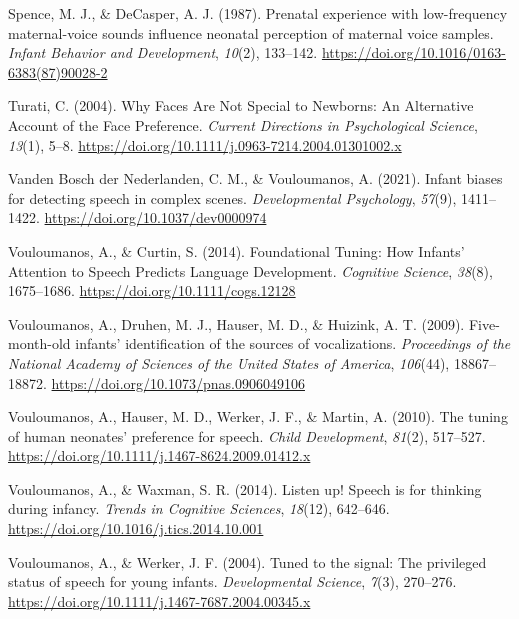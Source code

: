 \documentclass[
  man,mask,floatsintext]{apa6}
\newlength{\cslhangindent}
\newlength{\cslentryspacingunit} %
\newenvironment{CSLReferences}[2] %
 {%
  \setlength{\parindent}{0pt}
  \ifodd #1
  \let\oldpar\par
  \def\par{\hangindent=\cslhangindent\oldpar}
  \fi
  \setlength{\parskip}{#2\cslentryspacingunit}
 }%
 {}
\begin{document}
\begin{CSLReferences}{1}{0}
\leavevmode{}%
Spence, M. J., \& DeCasper, A. J. (1987). Prenatal experience with low-frequency maternal-voice sounds influence neonatal perception of maternal voice samples. \emph{Infant Behavior and Development}, \emph{10}(2), 133--142. \url{https://doi.org/10.1016/0163-6383(87)90028-2}

\leavevmode{}%
Turati, C. (2004). Why {Faces} {Are} {Not} {Special} to {Newborns}: {An} {Alternative} {Account} of the {Face} {Preference}. \emph{Current Directions in Psychological Science}, \emph{13}(1), 5--8. \url{https://doi.org/10.1111/j.0963-7214.2004.01301002.x}

\leavevmode{}%
Vanden Bosch der Nederlanden, C. M., \& Vouloumanos, A. (2021). Infant biases for detecting speech in complex scenes. \emph{Developmental Psychology}, \emph{57}(9), 1411--1422. \url{https://doi.org/10.1037/dev0000974}

\leavevmode{}%
Vouloumanos, A., \& Curtin, S. (2014). Foundational {Tuning}: {How} {Infants}' {Attention} to {Speech} {Predicts} {Language} {Development}. \emph{Cognitive Science}, \emph{38}(8), 1675--1686. \url{https://doi.org/10.1111/cogs.12128}

\leavevmode{}%
Vouloumanos, A., Druhen, M. J., Hauser, M. D., \& Huizink, A. T. (2009). Five-month-old infants' identification of the sources of vocalizations. \emph{Proceedings of the National Academy of Sciences of the United States of America}, \emph{106}(44), 18867--18872. \url{https://doi.org/10.1073/pnas.0906049106}

\leavevmode{}%
Vouloumanos, A., Hauser, M. D., Werker, J. F., \& Martin, A. (2010). The tuning of human neonates' preference for speech. \emph{Child Development}, \emph{81}(2), 517--527. \url{https://doi.org/10.1111/j.1467-8624.2009.01412.x}

\leavevmode{}%
Vouloumanos, A., \& Waxman, S. R. (2014). Listen up! {Speech} is for thinking during infancy. \emph{Trends in Cognitive Sciences}, \emph{18}(12), 642--646. \url{https://doi.org/10.1016/j.tics.2014.10.001}

\leavevmode{}%
Vouloumanos, A., \& Werker, J. F. (2004). Tuned to the signal: The privileged status of speech for young infants. \emph{Developmental Science}, \emph{7}(3), 270--276. \url{https://doi.org/10.1111/j.1467-7687.2004.00345.x}


\end{CSLReferences}
\end{document}
